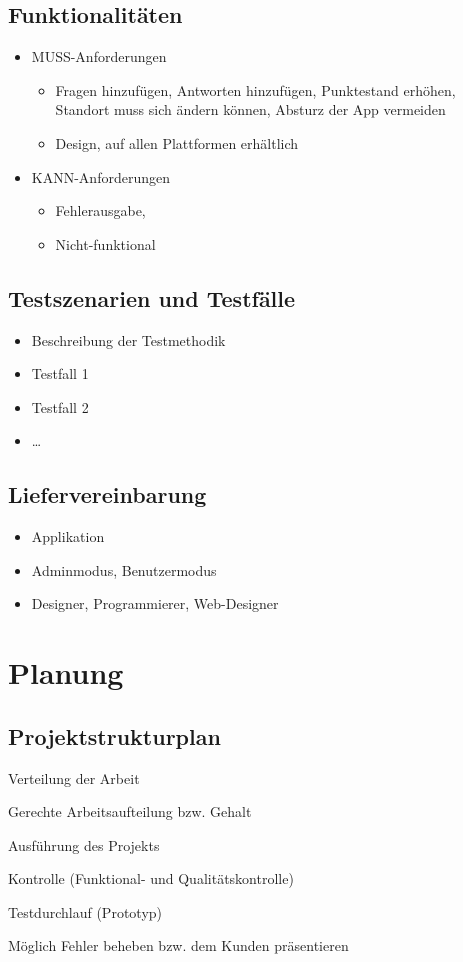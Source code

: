 \subsection{Funktionalitäten}
\begin{itemize}
	\item MUSS-Anforderungen
	\begin{itemize}
		\item Fragen hinzufügen, Antworten hinzufügen, Punktestand erhöhen, Standort muss sich ändern können, Absturz der App vermeiden
		\item Design, auf allen Plattformen erhältlich
	\end{itemize}
	\item KANN-Anforderungen
	\begin{itemize}
		\item Fehlerausgabe, 
		\item Nicht-funktional
	\end{itemize}
\end{itemize}
\subsection{Testszenarien und Testfälle}
\begin{itemize}
	\item Beschreibung der Testmethodik
	\item Testfall 1
	\item Testfall 2
	\item \ldots
\end{itemize}
\subsection{Liefervereinbarung}
\begin{itemize}
	\item Applikation
	\item Adminmodus, Benutzermodus
	\item Designer, Programmierer, Web-Designer
\end{itemize}
\section{Planung}
\subsection{Projektstrukturplan}

\begin{itemsize}
	\item Verteilung der Arbeit
	\item Gerechte Arbeitsaufteilung bzw. Gehalt
	\item Ausführung des Projekts
	\item Kontrolle (Funktional- und Qualitätskontrolle)
	\item Testdurchlauf (Prototyp)
	\item Möglich Fehler beheben bzw. dem Kunden präsentieren
\end{itemsize}



